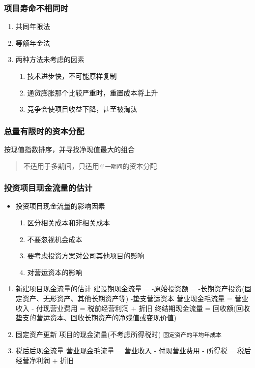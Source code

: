 \documentclass[11pt]{article}
\begin{document}
\subsubsection{项目寿命不相同时}
\label{sec:org270afaa}
\begin{enumerate}
\item 共同年限法
\item 等额年金法

\item 两种方法未考虑的因素
\begin{enumerate}
\item 技术进步快，不可能原样复制
\item 通货膨胀那个比较严重时，重置成本将上升
\item 竞争会使项目收益下降，甚至被淘汰
\end{enumerate}
\end{enumerate}
\subsubsection{总量有限时的资本分配}
\label{sec:org215dd67}
按现值指数排序，并寻找净现值最大的组合
\begin{quote}
不适用于多期间，只适用\texttt{单一期间}的资本分配
\end{quote}
\subsubsection{投资项目现金流量的估计}
\label{sec:org5d82eae}
\begin{itemize}
\item 投资项目现金流量的影响因素
\begin{enumerate}
\item 区分相关成本和非相关成本
\item 不要忽视机会成本
\item 要考虑投资方案对公司其他项目的影响
\item 对营运资本的影响
\end{enumerate}
\end{itemize}
\begin{enumerate}
\item 新建项目现金流量的估计
\label{sec:org82d9de6}
建设期现金流量 = -原始投资额 = -长期资产投资(固定资产、无形资产、其他长期资产等) -垫支营运资本
营业现金毛流量 = 营业收入 - 付现营业费用 = 税前经营利润 + 折旧
终结期现金流量 = 回收额(回收垫支的营运资本、回收长期资产的净残值或变现价值)
\item 固定资产更新 项目的现金流量(不考虑所得税时)
\label{sec:org37133fe}
\texttt{固定资产的平均年成本}
\item 税后后现金流量
\label{sec:org3687163}
营业现金毛流量 = 营业收入 - 付现营业费用 - 所得税 = 税后经营净利润 + 折旧
\end{enumerate}
\end{document}

